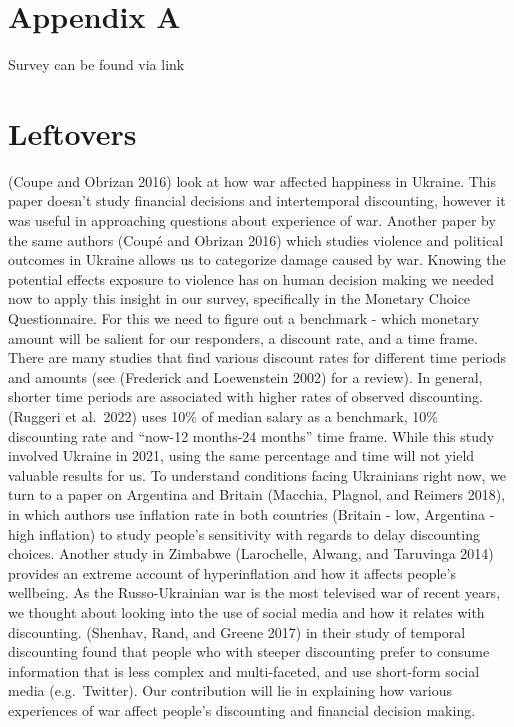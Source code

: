\documentclass[
  letterpaper,
  DIV=11,
  numbers=noendperiod]{scrartcl}
\begin{document}
\hypertarget{appendix-a}{%
\section{Appendix A}\label{appendix-a}}

Survey can be found via link

\hypertarget{leftovers}{%
\section{Leftovers}\label{leftovers}}

(Coupe and Obrizan 2016) look at how war affected happiness in Ukraine.
This paper doesn't study financial decisions and intertemporal
discounting, however it was useful in approaching questions about
experience of war. Another paper by the same authors (Coupé and Obrizan
2016) which studies violence and political outcomes in Ukraine allows us
to categorize damage caused by war. Knowing the potential effects
exposure to violence has on human decision making we needed now to apply
this insight in our survey, specifically in the Monetary Choice
Questionnaire. For this we need to figure out a benchmark - which
monetary amount will be salient for our responders, a discount rate, and
a time frame. There are many studies that find various discount rates
for different time periods and amounts (see (Frederick and Loewenstein
2002) for a review). In general, shorter time periods are associated
with higher rates of observed discounting. (Ruggeri et al.~2022) uses
10\% of median salary as a benchmark, 10\% discounting rate and ``now-12
months-24 months'' time frame. While this study involved Ukraine in
2021, using the same percentage and time will not yield valuable results
for us. To understand conditions facing Ukrainians right now, we turn to
a paper on Argentina and Britain (Macchia, Plagnol, and Reimers 2018),
in which authors use inflation rate in both countries (Britain - low,
Argentina - high inflation) to study people's sensitivity with regards
to delay discounting choices. Another study in Zimbabwe (Larochelle,
Alwang, and Taruvinga 2014) provides an extreme account of
hyperinflation and how it affects people's wellbeing. As the
Russo-Ukrainian war is the most televised war of recent years, we
thought about looking into the use of social media and how it relates
with discounting. (Shenhav, Rand, and Greene 2017) in their study of
temporal discounting found that people who with steeper discounting
prefer to consume information that is less complex and multi-faceted,
and use short-form social media (e.g.~Twitter). Our contribution will
lie in explaining how various experiences of war affect people's
discounting and financial decision making.
\end{document}
